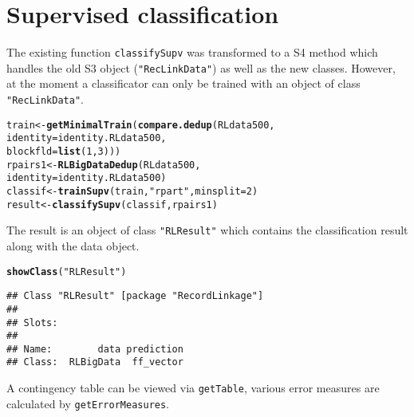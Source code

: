 \documentclass[a4paper]{article}\usepackage[]{graphicx}\usepackage[]{color}
\makeatletter
\newcommand{\hlnum}[1]{\textcolor[rgb]{0.686,0.059,0.569}{#1}}%
\newcommand{\hlstr}[1]{\textcolor[rgb]{0.192,0.494,0.8}{#1}}%
\newcommand{\hlstd}[1]{\textcolor[rgb]{0.345,0.345,0.345}{#1}}%
\newcommand{\hlkwb}[1]{\textcolor[rgb]{0.69,0.353,0.396}{#1}}%
\newcommand{\hlkwc}[1]{\textcolor[rgb]{0.333,0.667,0.333}{#1}}%
\newcommand{\hlkwd}[1]{\textcolor[rgb]{0.737,0.353,0.396}{\textbf{#1}}}%
\newenvironment{kframe}{%
 \def\at@end@of@kframe{}%
 \ifinner\ifhmode%
  \def\at@end@of@kframe{\end{minipage}}%
  \begin{minipage}{\columnwidth}%
 \fi\fi%
 \def\FrameCommand##1{\hskip\@totalleftmargin \hskip-\fboxsep
 \colorbox{shadecolor}{##1}\hskip-\fboxsep
     \hskip-\linewidth \hskip-\@totalleftmargin \hskip\columnwidth}%
 \MakeFramed {\advance\hsize-\width
   \@totalleftmargin\z@ \linewidth\hsize
   \@setminipage}}%
 {\par\unskip\endMakeFramed%
 \at@end@of@kframe}
\newenvironment{knitrout}{}{} %
\makeatother
\begin{document}
\section{Supervised classification}

The existing function \texttt{classifySupv} was transformed to a S4 method
which handles the old S3 object (\texttt{"RecLinkData"}) as well as the new 
classes.  However, at the moment a classificator can only be trained with
an object of class \texttt{"RecLinkData"}.

\begin{knitrout}
\color{fgcolor}\begin{kframe}
\begin{alltt}
\hlstd{train} \hlkwb{<-} \hlkwd{getMinimalTrain}\hlstd{(}\hlkwd{compare.dedup}\hlstd{(RLdata500,}
         \hlkwc{identity} \hlstd{= identity.RLdata500,}
         \hlkwc{blockfld} \hlstd{=} \hlkwd{list}\hlstd{(}\hlnum{1}\hlstd{,}\hlnum{3}\hlstd{)))}
\hlstd{rpairs1} \hlkwb{<-} \hlkwd{RLBigDataDedup}\hlstd{(RLdata500,}
           \hlkwc{identity} \hlstd{= identity.RLdata500)}
\hlstd{classif} \hlkwb{<-} \hlkwd{trainSupv}\hlstd{(train,} \hlstr{"rpart"}\hlstd{,} \hlkwc{minsplit}\hlstd{=}\hlnum{2}\hlstd{)}
\hlstd{result} \hlkwb{<-} \hlkwd{classifySupv}\hlstd{(classif, rpairs1)}
\end{alltt}
\end{kframe}
\end{knitrout}

The result is an object of class \texttt{"RLResult"} which contains the
classification result along with the data object.

\begin{knitrout}
\color{fgcolor}\begin{kframe}
\begin{alltt}
\hlkwd{showClass}\hlstd{(}\hlstr{"RLResult"}\hlstd{)}
\end{alltt}
\begin{verbatim}
## Class "RLResult" [package "RecordLinkage"]
## 
## Slots:
##                             
## Name:        data prediction
## Class:  RLBigData  ff_vector
\end{verbatim}
\end{kframe}
\end{knitrout}

A contingency table can be viewed via \texttt{getTable}, various error measures
are calculated by \texttt{getErrorMeasures}.
\end{document}
